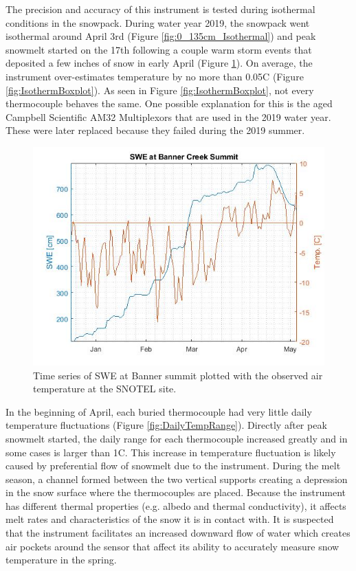 The precision and accuracy of this instrument is tested during isothermal conditions in the snowpack. During water year 2019, the snowpack went isothermal around April 3rd (Figure \ref{fig:0_135cm_Isothermal}) and peak snowmelt started on the 17th following a couple warm storm events that deposited a few inches of snow in early April (Figure \ref{fig:SWE_SNTLTemp}). On average, the instrument over-estimates temperature by no more than 0.05\textdegree C (Figure \ref{fig:IsothermBoxplot}). As seen in Figure \ref{fig:IsothermBoxplot}, not every thermocouple behaves the same. One possible explanation for this is the aged Campbell Scientific AM32 Multiplexors that are used in the 2019 water year. These were later replaced because they failed during the 2019 summer.  
 
\begin{figure}[H]
    \centering
    \includegraphics[width=0.7\linewidth]{figures/SWE_SNTLTemp.jpg}
    \caption{Time series of SWE at Banner summit plotted with the observed air temperature at the SNOTEL site.}
    \label{fig:SWE_SNTLTemp}
\end{figure}

In the beginning of April, each buried thermocouple had very little daily temperature fluctuations (Figure \ref{fig:DailyTempRange}). Directly after peak snowmelt started, the daily range for each thermocouple increased greatly and in some cases is larger than 1\textdegree C. This increase in temperature fluctuation is likely caused by preferential flow of snowmelt due to the instrument. During the melt season, a channel formed between the two vertical supports creating a depression in the snow surface where the thermocouples are placed. Because the instrument has different thermal properties (e.g. albedo and thermal conductivity), it affects melt rates and characteristics of the snow it is in contact with. It is suspected that the instrument facilitates an increased downward flow of water which creates air pockets around the sensor that affect its ability to accurately measure snow temperature in the spring. 

